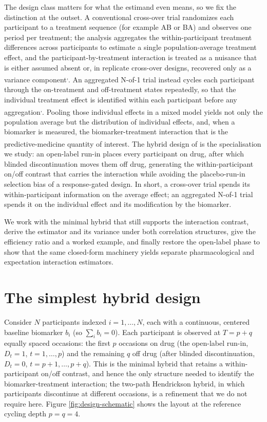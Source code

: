 \documentclass[
  11pt,
]{article}
\begin{document}
The design class matters for what the estimand even means, so we fix
the distinction at the outset. A conventional cross-over trial
randomizes each participant to a treatment sequence (for example AB or
BA) and observes one period per treatment; the analysis aggregates the
within-participant treatment differences across participants to
estimate a single population-average treatment effect, and the
participant-by-treatment interaction is treated as a nuisance that is
either assumed absent or, in replicate cross-over designs, recovered
only as a variance component\textsuperscript{,}.
An aggregated N-of-1 trial instead cycles each participant through the
on-treatment and off-treatment states repeatedly, so that the
individual treatment effect is identified within each participant
before any aggregation\textsuperscript{,}. Pooling
those individual effects in a mixed model yields not only the
population average but the distribution of individual effects, and,
when a biomarker is measured, the biomarker-treatment interaction
that is the predictive-medicine quantity of interest\textsuperscript{}. The hybrid design of\textsuperscript{} is the
specialisation we study: an open-label run-in places every participant
on drug, after which blinded discontinuation moves them off drug,
generating the within-participant on/off contrast that carries the
interaction while avoiding the placebo-run-in selection bias of a
response-gated design. In short, a cross-over trial spends its
within-participant information on the average effect; an aggregated
N-of-1 trial spends it on the individual effect and its modification
by the biomarker.

We work with the minimal hybrid that still supports the interaction
contrast, derive the estimator and its variance under both correlation
structures, give the efficiency ratio and a worked example, and
finally restore the open-label phase to show that the same closed-form
machinery yields separate pharmacological and expectation interaction
estimators.

\section{The simplest hybrid design}\label{the-simplest-hybrid-design}

Consider \(N\) participants indexed \(i = 1, \dots, N\), each with a
continuous, centered baseline biomarker \(b_i\) (so \(\sum_i b_i = 0\)).
Each participant is observed at \(T = p + q\) equally spaced occasions:
the first \(p\) occasions on drug (the open-label run-in,
\(D_t = 1\), \(t = 1, \dots, p\)) and the remaining \(q\) off drug (after
blinded discontinuation, \(D_t = 0\), \(t = p+1, \dots, p+q\)). This is
the minimal hybrid that retains a within-participant on/off contrast,
and hence the only structure needed to identify the
biomarker-treatment interaction; the two-path Hendrickson hybrid,
in which participants discontinue at different occasions, is a
refinement that we do not require here. Figure
\ref{fig:design-schematic} shows the layout at the reference cycling
depth \(p = q = 4\).
\end{document}
